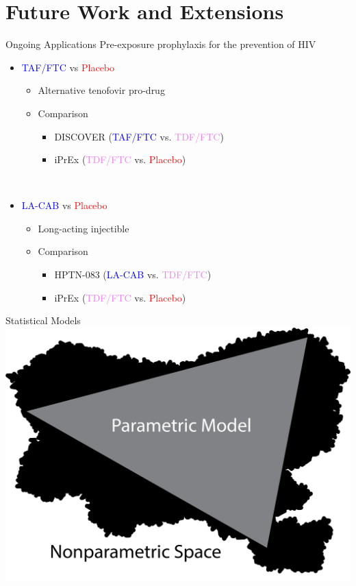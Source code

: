 \documentclass{beamer}
\newcommand{\blue}[1]{\textcolor{blue}{#1}}
\newcommand{\red}[1]{\textcolor{red}{#1}}
\newcommand{\violet}[1]{\textcolor{violet}{#1}}
\begin{document}
\section{Future Work and Extensions}

\begin{frame}{Ongoing Applications}
	Pre-exposure prophylaxis for the prevention of HIV
	\begin{itemize}
		\item \blue{TAF/FTC} vs \red{Placebo}
		\begin{itemize}
			\item Alternative tenofovir pro-drug
			\item Comparison 
			\begin{itemize}
				\item DISCOVER (\blue{TAF/FTC} vs. \violet{TDF/FTC})
				\item iPrEx (\violet{TDF/FTC} vs. \red{Placebo})
			\end{itemize}
		\end{itemize}~\\
		\item \blue{LA-CAB} vs \red{Placebo}
		\begin{itemize}
			\item Long-acting injectible
			\item Comparison 
			\begin{itemize}
				\item HPTN-083 (\blue{LA-CAB} vs. \violet{TDF/FTC})
				\item iPrEx (\violet{TDF/FTC} vs. \red{Placebo})
			\end{itemize}
		\end{itemize}
	\end{itemize}
\end{frame}

\begin{frame}{Statistical Models}
	\centering
	\includegraphics[scale=0.55]{images/parametric_model.png}
\end{frame}
\end{document}
